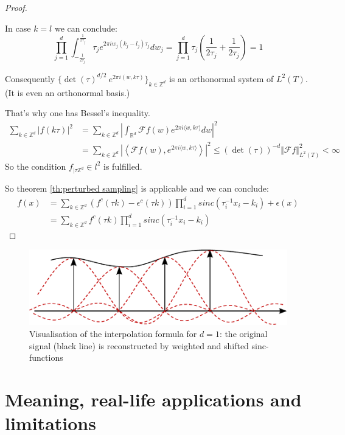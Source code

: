 \documentclass[a4paper, 11pt]{scrreprt}
\newcommand{\RR}{\mathbb{R}}
\newcommand{\ZZ}{\mathbb{Z}}
\newcommand{\FF}{\mathcal{F}}
\begin{document}
\begin{proof}[Proof]
\begin{itemize}
In case $k = l$ we can conclude:
\[\prod_{j=1}^d \int_{-\frac{1}{2\tau_j}}^{\frac{1}{2\tau_j}} \tau_j e^{2 \pi i w_j (k_j-l_j) \tau_j}dw_j
= \prod_{j=1}^d \tau_j \left(\frac{1}{2\tau_j}+\frac{1}{2\tau_j}\right) = 1\]

Consequently $\{\det(\tau)^{d/2}\ e^{2 \pi i (w,k \tau)}\}_{k \in \ZZ^d}$ is an orthonormal system of $L^2(T)$. (It is even an orthonormal basis.)

That's why one has Bessel's inequality.
\begin{align*}
\sum_{k \in \ZZ^d} |f(k \tau)|^2
&= \sum_{k \in \ZZ^d} | \int_{\RR^d} \FF f(w) e^{2 \pi i \langle w,k \tau \rangle}dw|^2 \\
&= \sum_{k \in \ZZ^d} | \left\langle \FF f(w), e^{2 \pi i \langle w,k \tau \rangle}\right\rangle |^2
\leq (\det(\tau))^{-d} \Vert \FF f \Vert_{L^2(T)}^2 < \infty
\end{align*}
So the condition $f_{|\tau\ZZ^d} \in l^2$ is fulfilled.

\end{itemize}

So theorem \ref{th:perturbed sampling} is applicable and we can conclude:
\begin{align*}
f(x) &= \sum_{k\in\ZZ^d} (f^c(\tau k)-\epsilon^c(\tau k))\prod _{i=1}^d sinc(\tau_i^{-1}x_i-k_i)+\epsilon(x) \\
&= \sum_{k \in \ZZ^d} f^c(\tau k) \prod_{i=1}^d sinc\left(\tau_i^{-1} x_i -k_i\right)  
\end{align*}

\end{proof}
\begin{figure}[htpb]
	\centering
	\includegraphics[width=0.80 \textwidth]{Rekonstruktion-Visualisierung.pdf}
	\caption{Visualisation of the interpolation formula for \(d=1\): the original signal (black line) is reconstructed by weighted and shifted sinc-functions}
\end{figure}


\newpage
\section{Meaning, real-life applications and limitations}
\end{document}
